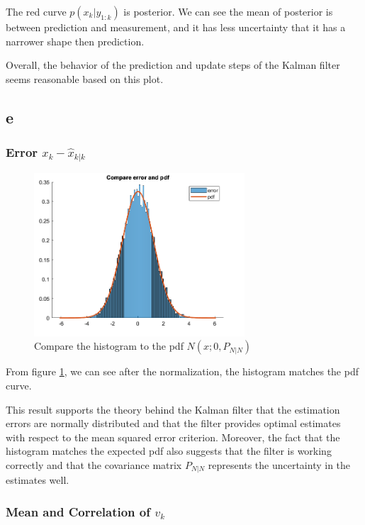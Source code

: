 The red curve $p(x_{k}\big|y_{1:k})$ is posterior. We can see the mean of posterior is between prediction and measurement, and it has less uncertainty that it has a narrower shape then prediction.

Overall, the behavior of the prediction and update steps of the Kalman filter seems reasonable based on this plot.

\subsection{e}

\subsubsection{Error $x_{k}-\hat{x}_{k|k}$}

\begin{figure}[H]
 \centering
 \includegraphics[width=0.7\textwidth]{images/higstogramandpdffor1e.png}
 \caption{Compare the histogram to the pdf $N(x;0, P_{N|N})$}
 \label{1e1}
\end{figure}

From figure \ref{1e1}, we can see after the normalization, the histogram matches the pdf curve.

This result supports the theory behind the Kalman filter that the estimation errors are normally distributed and that the filter provides optimal estimates with respect to the mean squared error criterion. Moreover, the fact that the histogram matches the expected pdf also suggests that the filter is working correctly and that the covariance matrix $P_{N|N}$ represents the uncertainty in the estimates well.

\subsubsection{Mean and Correlation of $v_k$}


